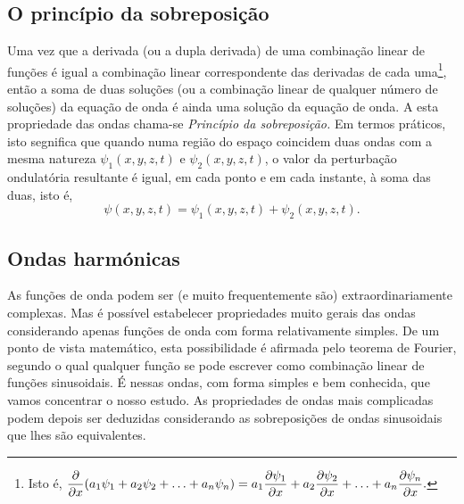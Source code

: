 \subsection{O princípio da sobreposição}
Uma vez que a derivada (ou a dupla derivada) de uma combinação linear de funções
é igual a combinação linear correspondente das derivadas de cada
uma\footnote{Isto é,
    $\displaystyle\frac{\partial }{\partial x}(a_1\psi_1+a_2\psi_2+\ldots+a_n\psi_n)=
a_1\frac{\partial \psi_1}{\partial x}+a_2\frac{\partial \psi_2}{\partial x}+\ldots+a_n\frac{\partial \psi_n}{\partial x}.$}, então a soma
de duas soluções (ou a combinação linear de qualquer número de soluções) da
equação de onda é ainda uma solução da equação de onda. A esta propriedade das
ondas chama-se \emph{Princípio da sobreposição.} Em termos práticos, isto
segnifica que quando numa região do espaço coincidem duas ondas com a mesma
natureza $\psi_1(x,y,z,t)$ e $\psi_2(x,y,z,t)$, o valor da perturbação
ondulatória resultante é igual, em cada ponto e em cada instante, à soma das
duas, isto é,
\begin{equation*}
\psi(x,y,z,t)=\psi_1(x,y,z,t)+\psi_2(x,y,z,t).
\end{equation*}

\subsection{Ondas harmónicas}
As funções de onda podem ser (e muito frequentemente são) extraordinariamente
complexas. Mas é possível estabelecer propriedades muito gerais das ondas
considerando apenas funções de onda com forma relativamente simples. De um ponto
de vista matemático, esta possibilidade é afirmada pelo teorema de Fourier,
segundo o qual qualquer função se pode escrever como combinação linear de
funções sinusoidais. É nessas ondas, com forma simples e bem conhecida, que
vamos concentrar o nosso estudo. As propriedades de ondas mais complicadas podem
depois ser deduzidas considerando as sobreposições de ondas sinusoidais que lhes
são equivalentes.

